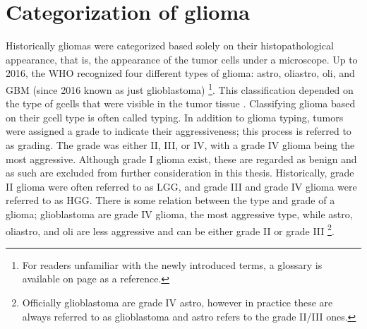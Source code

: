 \section{Categorization of glioma}
Historically \glspl{glioma} were categorized based solely on their histopathological appearance, that is, the appearance of the \gls{tumor} cells under a microscope.
Up to 2016, the \gls{WHO} recognized four different types of \gls{glioma}: \gls{astro}, \gls{oliastro}, \gls{oli}, and \gls{GBM} (since 2016 known as just \gls{glioblastoma}) \footnote{For readers unfamiliar with the newly introduced terms, a glossary is available on page \pageref{glossary} as a reference.}.
This classification depended on the type of \glspl{gcell} that were visible in the \gls{tumor} tissue \autocite{louis2007who}.
Classifying \gls{glioma} based on their \gls{gcell} type is often called typing.
In addition to \gls{glioma} typing, \glspl{tumor} were assigned a grade to indicate their aggressiveness; this process is referred to as grading.
The grade was either II, III, or IV, with a grade IV \gls{glioma} being the most aggressive.
Although grade I \gls{glioma} exist, these are regarded as benign and as such are excluded from further consideration in this thesis.
Historically, grade II \gls{glioma} were often referred to as \gls{LGG}, and grade III and grade IV \gls{glioma} were referred to as \gls{HGG}.
There is some relation between the type and grade of a glioma; \gls{glioblastoma} are grade IV glioma, the most aggressive type, while \gls{astro}, \gls{oliastro}, and \gls{oli} are less aggressive and can be either grade II or grade III \footnote{Officially \gls{glioblastoma} are grade IV \gls{astro}, however in practice these are always referred to as \gls{glioblastoma} and \gls{astro} refers to the grade II/III ones.}.

